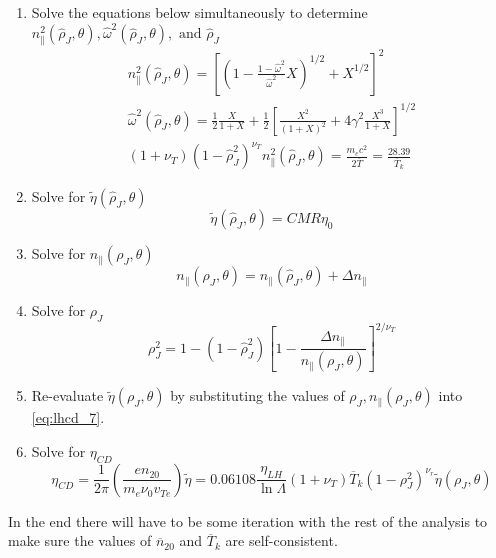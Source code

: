 \begin{enumerate}
	\item Solve the equations below simultaneously to determine $n _ { \| } ^ { 2 } \left( \hat { \rho } _ { J } , \theta \right) , \hat { \omega } ^ { 2 } \left( \hat { \rho } _ { J } , \theta \right) , \text { and } \hat { \rho } _ { J }$ \\
\begin{equation}
	\begin{array} { l } { n _ { \| } ^ { 2 } \left( \hat { \rho } _ { J } , \theta \right) = \left[ \left( 1 - \frac { 1 - \hat { \omega } ^ { 2 } } { \hat { \omega } ^ { 2 } } X \right) ^ { 1 / 2 } + X ^ { 1 / 2 } \right] ^ { 2 } } \\ { \hat { \omega } ^ { 2 } \left( \hat { \rho } _ { J } , \theta \right) = \frac { 1 } { 2 } \frac { X } { 1 + X } + \frac { 1 } { 2 } \left[ \frac { X ^ { 2 } } { ( 1 + X ) ^ { 2 } } + 4 \gamma ^ { 2 } \frac { X ^ { 3 } } { 1 + X } \right] ^ { 1 / 2 } } \\ { \left( 1 + \nu _ { T } \right) \left( 1 - \hat { \rho } _ { J } ^ { 2 } \right) ^ { \nu _ { T } } n _ { \| } ^ { 2 } \left( \hat { \rho } _ { J } , \theta \right) = \frac { m _ { e } c ^ { 2 } } { 2 \overline { T } } = \frac { 28.39 } { \overline { T } _ { k } } } \end{array}
\end{equation}
	\item Solve for $\tilde { \eta } \left( \hat { \rho } _ { J } , \theta \right)$
	\begin{equation}
		\label{eq:lhcd_7}
		\tilde { \eta } \left( \hat { \rho } _ { J } , \theta \right) = C M R \eta _ { 0 }
	\end{equation}
	\item Solve for $n _ { \| } \left( \rho _ { J } , \theta \right)$
	\begin{equation}
		n _ { \| } \left( \rho _ { J } , \theta \right) = n _ { \| } \left( \hat { \rho } _ { J } , \theta \right) + \Delta n _ { \| }
	\end{equation}
	\item Solve for $\rho_J$ 
	\begin{equation}
		\rho _ { J } ^ { 2 } = 1 - \left( 1 - \hat { \rho } _ { J } ^ { 2 } \right) \left[ 1 - \frac { \Delta n _ { \| } } { n _ { \| } \left( \rho _ { J } , \theta \right) } \right] ^ { 2 / \nu _ { T } }
	\end{equation}
	\item Re-evaluate $\tilde { \eta } \left( \rho _ { J } , \theta \right)$ by substituting the values of $\rho _ { J } , n _ { \| } \left( \rho _ { J } , \theta \right)$ into \cref{eq:lhcd_7}.
	\item Solve for $\eta_{CD}$
	\begin{equation}
		\eta _ { C D } = \frac { 1 } { 2 \pi } \left( \frac { e n _ { 20 } } { m _ { e } \nu _ { 0 } v _ { T e } } \right) \tilde { \eta } = 0.06108 \frac { \eta _ { L H } } { \ln \Lambda } \left( 1 + \nu _ { T } \right) \overline { T } _ { k } \left( 1 - \rho _ { J } ^ { 2 } \right) ^ { \nu _ { r } } \tilde { \eta } \left( \rho _ { J } , \theta \right)
	\end{equation} 
\end{enumerate}
In the end there will have to be some iteration with the rest of the analysis to make sure the values of $\overline n_20$ and $\overline T_k$ are self-consistent.

